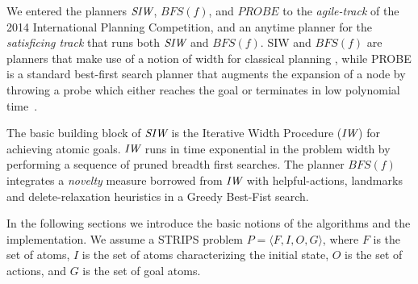 
We entered the planners ${\textit{SIW}}$, $BFS(f)$, and $PROBE$ to the
\emph{agile-track} of the 2014 International Planning Competition, and an anytime
planner for the \emph{satisficing track} that runs both ${\textit{SIW}}$ and $BFS(f)$.
SIW and $BFS(f)$ are planners that make use of a notion of width for classical planning \cite{nir:ecai12}, while PROBE is a standard best-first search planner that augments the expansion of a node by throwing a probe which
either reaches the goal or terminates in low polynomial time~\cite{nir:icaps11}.

The basic building block of ${\textit{SIW}}$ is the Iterative Width Procedure
(${\textit{IW}}$) for achieving atomic goals. ${\textit{IW}}$ runs in time exponential in
the problem width by performing a sequence of pruned breadth first
searches.  The planner $BFS(f)$ integrates a \emph{novelty} measure
borrowed from ${\textit{IW}}$ with helpful-actions, landmarks and
delete-relaxation heuristics in a Greedy Best-Fist
search.  

In the following sections we introduce the basic notions of the
algorithms and the implementation. We assume a STRIPS problem $P =
\langle F,I,O,G\rangle$, where $F$ is the set of atoms, $I$ is the set
of atoms characterizing the initial state, $O$ is the set of actions,
and $G$ is the set of goal atoms.
